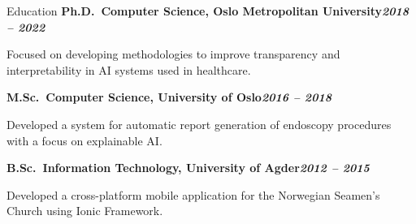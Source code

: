 \begin{rubric}{Education}
\entry*[]%
\textbf{Ph.D.~Computer Science, Oslo Metropolitan University\hfill\textit{2018 -- 2022}} \par
\begin{compactitem}
    \item Focused on developing methodologies to improve transparency and interpretability in AI systems used in healthcare.
    \vspace{-12pt}
\end{compactitem}
%
\entry*[]%
\textbf{M.Sc.~Computer Science, University of Oslo\hfill\textit{2016 -- 2018}} \par
\begin{compactitem}
    \item Developed a system for automatic report generation of endoscopy procedures with a focus on explainable AI.
    \vspace{-12pt}
\end{compactitem}
% 
\entry*[]%
\textbf{B.Sc.~Information Technology, University of Agder\hfill\textit{2012 -- 2015}} \par
\begin{compactitem}
\item Developed a cross-platform mobile application for the Norwegian Seamen's Church using Ionic Framework.
\end{compactitem}
\end{rubric}